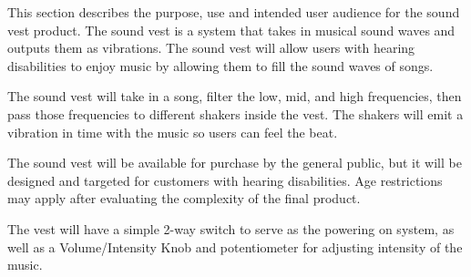 This section describes the purpose, use and intended user audience for the sound vest product. The sound vest is a system that takes in musical sound waves and outputs them as vibrations. The sound vest will allow users with hearing disabilities to enjoy music by allowing them to fill the sound waves of songs.

The sound vest will take in a song, filter the low, mid, and high frequencies, then pass those frequencies to different shakers inside the vest. The shakers will emit a vibration in time with the music so users can feel the beat.

The sound vest will be available for purchase by the general public, but it will be designed and targeted for customers with hearing disabilities. Age restrictions may apply after evaluating the complexity of the final product.

The vest will have a simple 2-way switch to serve as the powering on system, as well as a Volume/Intensity Knob and potentiometer for adjusting intensity of the music.
